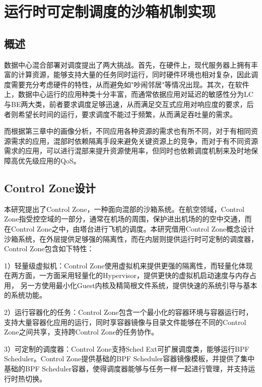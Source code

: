 \chapter{运行时可定制调度的沙箱机制实现}\label{chap:control_zone}

\section{概述}

数据中心混合部署对调度提出了两大挑战。首先，在硬件上，现代服务器上拥有丰富的计算资源，能够支持大量的任务同时运行，同时硬件环境也相对复杂，因此调度需要充分考虑硬件的特性，从而避免如"吵闹邻居"等情况出现。其次，在软件上，数据中心运行的应用种类十分丰富，而通常依据应用对延迟的敏感性分为LC与BE两大类，前者要求调度足够迅速，从而满足交互式应用对响应度的要求，后者则希望长时间的运行，要求调度不能过于频繁，从而满足吞吐量的需求。

而根据第三章中的画像分析，不同应用各种资源的需求也有所不同，对于有相同资源需求的应用，混部时依赖隔离手段来避免关键资源上的竞争，而对于有不同资源需求的应用，可以进行混部来提升资源使用率，但同时也依赖调度机制来及时地保障高优先级应用的QoS。

\section{Control Zone设计}



本研究提出了Control Zone，一种面向混部的沙箱系统。在航空领域，Control Zone指受控空域的一部分，通常在机场的周围，保护进出机场的的空中交通，而在Control Zone之中，由塔台进行飞机的调度。本研究借用Control Zone概念设计沙箱系统，在外层提供足够强的隔离性，而在内层则提供运行时可定制的调度器，Control Zone包含如下特性：

1）轻量级虚拟机：Control Zone使用虚拟机来提供更强的隔离性，而轻量化体现在两方面，一方面采用轻量化的Hypervisor，提供更快的虚拟机启动速度与内存占用， 另一方使用最小化Guest内核及精简根文件系统，提供快速的系统引导与基本的系统功能。

2）运行容器化的任务：Control Zone包含一个最小化的容器环境与容器运行时，支持大量容器化应用的运行，同时享容器镜像与目录文件能够在不同的Control Zone之间共享，支持跨Control Zone的任务协作。

3）可定制的调度器：Control Zone支持Sched Ext可扩展调度类，能够运行BPF Scheduler。Control Zone提供基础的BPF Scheduler容器镜像模板，并提供了集中基础的BPF Scheduler容器，使得调度器能够与任务一样一起进行管理，并支持运行时热切换。

